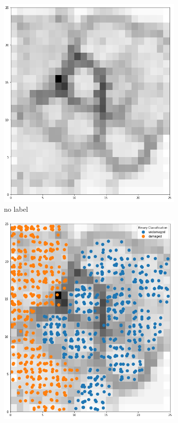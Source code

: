 \documentclass[twocolumn]{article}
\begin{document}
\begin{figure}
      \begin{subfigure}{0.245\textwidth}
            \includegraphics[width=\textwidth]{som_unsup_2525.png}
            \caption{no label}
            \label{fig:som_unsup_2525}
      \end{subfigure}
      \begin{subfigure}{0.245\textwidth}
            \centering
            \includegraphics[width=\textwidth]{som_2_2525.png}

\end{subfigure}
\end{figure}
\end{document}
